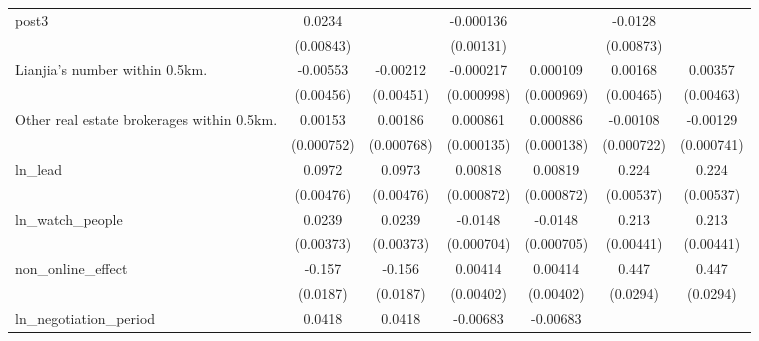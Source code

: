 {\begin{tabular}{l*{6}{c}}
post3               &      0.0234\sym{***}&                     &   -0.000136         &                     &     -0.0128         &                     \\
                    &   (0.00843)         &                     &   (0.00131)         &                     &   (0.00873)         &                     \\
\addlinespace
Lianjia's number within 0.5km.&    -0.00553         &    -0.00212         &   -0.000217         &    0.000109         &     0.00168         &     0.00357         \\
                    &   (0.00456)         &   (0.00451)         &  (0.000998)         &  (0.000969)         &   (0.00465)         &   (0.00463)         \\
\addlinespace
Other real estate brokerages within 0.5km.&     0.00153\sym{**} &     0.00186\sym{**} &    0.000861\sym{***}&    0.000886\sym{***}&    -0.00108         &    -0.00129\sym{*}  \\
                    &  (0.000752)         &  (0.000768)         &  (0.000135)         &  (0.000138)         &  (0.000722)         &  (0.000741)         \\
\addlinespace
ln\_lead             &      0.0972\sym{***}&      0.0973\sym{***}&     0.00818\sym{***}&     0.00819\sym{***}&       0.224\sym{***}&       0.224\sym{***}\\
                    &   (0.00476)         &   (0.00476)         &  (0.000872)         &  (0.000872)         &   (0.00537)         &   (0.00537)         \\
\addlinespace
ln\_watch\_people     &      0.0239\sym{***}&      0.0239\sym{***}&     -0.0148\sym{***}&     -0.0148\sym{***}&       0.213\sym{***}&       0.213\sym{***}\\
                    &   (0.00373)         &   (0.00373)         &  (0.000704)         &  (0.000705)         &   (0.00441)         &   (0.00441)         \\
\addlinespace
non\_online\_effect   &      -0.157\sym{***}&      -0.156\sym{***}&     0.00414         &     0.00414         &       0.447\sym{***}&       0.447\sym{***}\\
                    &    (0.0187)         &    (0.0187)         &   (0.00402)         &   (0.00402)         &    (0.0294)         &    (0.0294)         \\
\addlinespace
ln\_negotiation\_period&      0.0418\sym{***}&      0.0418\sym{***}&    -0.00683\sym{***}&    -0.00683\sym{***}&                     &                     \\

\end{tabular}}
